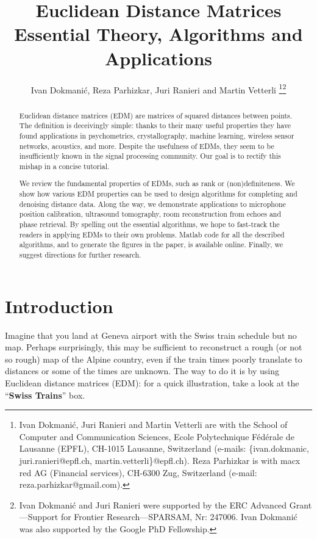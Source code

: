 \documentclass[10pt,double]{IEEEtran}
\title{{\fontsize{1.18cm}{1em}\selectfont Euclidean Distance Matrices} \\ \huge{Essential Theory, Algorithms and Applications}}
\author{Ivan Dokmani\'{c}, Reza Parhizkar, Juri Ranieri and Martin Vetterli
\thanks{Ivan Dokmani\'{c}, Juri Ranieri and Martin Vetterli are with the School of Computer and Communication
Sciences, Ecole Polytechnique F\'{e}d\'{e}rale de Lausanne (EPFL), CH-1015
Lausanne, Switzerland (e-mails: \{ivan.dokmanic, juri.ranieri@epfl.ch,
martin.vetterli\}@epfl.ch). Reza Parhizkar is with macx red AG (Financial services), CH-6300 Zug, Switzerland (e-mail: reza.parhizkar@gmail.com).}\thanks{Ivan Dokmani\'c and Juri Ranieri were supported by the ERC Advanced
Grant---Support for Frontier Research---SPARSAM, Nr: 247006. Ivan Dokmani\'c
was also supported by the Google PhD Fellowship.} }
\begin{document}
\maketitle





\begin{abstract}
Euclidean distance matrices (EDM) are matrices of squared distances between
points. The definition is deceivingly simple: thanks to their many useful
properties they have found applications in psychometrics, crystallography,
machine learning, wireless sensor networks, acoustics, and more. Despite the
usefulness of EDMs, they seem to be insufficiently known in the signal
processing community. Our goal is to rectify this mishap in a concise
tutorial.

We review the fundamental properties of EDMs, such as  rank or
(non)definiteness. We show how various EDM properties can be used to design
algorithms for completing and denoising distance data. Along the way, we
demonstrate applications to microphone position calibration, ultrasound
tomography, room reconstruction from echoes and phase retrieval. By spelling
out the essential algorithms, we hope to fast-track the readers in applying
EDMs to their own problems. Matlab code for all the described algorithms, and
to generate the figures in the paper, is available online. Finally, we suggest
directions for further research.
\end{abstract}



\section{Introduction}

Imagine that you land at Geneva airport with the Swiss train schedule but no
map. Perhaps surprisingly, this may be sufficient to reconstruct a rough (or
not so rough) map of the Alpine country, even if the train times poorly
translate to distances or some of the times are unknown. The way to do it is
by using Euclidean distance matrices (EDM): for a quick illustration, take a
look at the ``\textbf{Swiss Trains}'' box.
\end{document}
